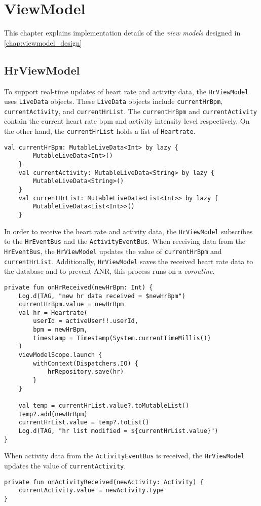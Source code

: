 \section{ViewModel}
This chapter explains implementation details of the \emph{view models} designed in \autoref{chap:viewmodel_design}

\subsection{HrViewModel}
\label{chap:hrviewmodel_impl}
To support real-time updates of heart rate and activity data, the \verb;HrViewModel; uses \verb;LiveData; objects. These \verb;LiveData; objects include \verb;currentHrBpm;, \verb;currentActivity;, and \verb;currentHrList;.
The \verb;currentHrBpm; and \verb;currentActivity; contain the current heart rate bpm and activity intensity level respectively. On the other hand, the \verb;currentHrList; holds a list of \verb;Heartrate;.
\begin{lstlisting}[caption={LiveData implementation (Kotlin - HrViewModel)}]
    val currentHrBpm: MutableLiveData<Int> by lazy {
        MutableLiveData<Int>()
    }
    val currentActivity: MutableLiveData<String> by lazy {
        MutableLiveData<String>()
    }
    val currentHrList: MutableLiveData<List<Int>> by lazy {
        MutableLiveData<List<Int>>()
    }
\end{lstlisting}

In order to receive the heart rate and activity data, the \verb;HrViewModel; subscribes to the \verb;HrEventBus; and the \verb;ActivityEventBus;. 
When receiving data from the \verb;HrEventBus;, the \verb;HrViewModel; updates the value of \verb;currentHrBpm; and \verb;currentHrList;. 
Additionally, \verb;HrViewModel; saves the received heart rate data to the database and to prevent ANR, this process runs on a \emph{coroutine}.
\begin{lstlisting}[caption={On heart rate event received (Kotlin - HrViewModel)}]
private fun onHrReceived(newHrBpm: Int) {
    Log.d(TAG, "new hr data received = $newHrBpm")
    currentHrBpm.value = newHrBpm
    val hr = Heartrate(
        userId = activeUser!!.userId,
        bpm = newHrBpm,
        timestamp = Timestamp(System.currentTimeMillis())
    )
    viewModelScope.launch {
        withContext(Dispatchers.IO) {
            hrRepository.save(hr)
        }
    }

    val temp = currentHrList.value?.toMutableList()
    temp?.add(newHrBpm)
    currentHrList.value = temp?.toList()
    Log.d(TAG, "hr list modified = ${currentHrList.value}")
}
\end{lstlisting}
When activity data from the \verb;ActivityEventBus; is received, the \verb;HrViewModel; updates the value of \verb;currentActivity;.
\begin{lstlisting}[caption={On activity event received (Kotlin - HrViewModel)}]
private fun onActivityReceived(newActivity: Activity) {
    currentActivity.value = newActivity.type
}
\end{lstlisting}

